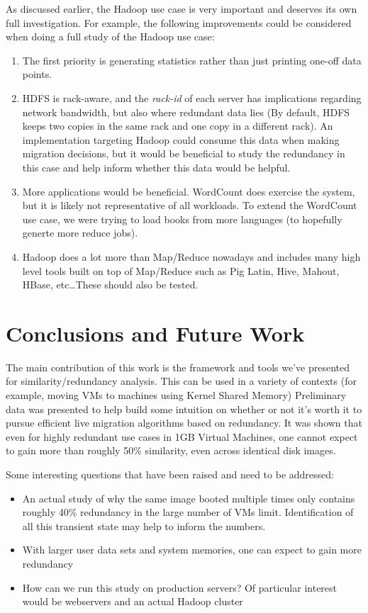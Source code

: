 \documentclass{acm_proc_article-sp}
\begin{document}
As discussed earlier, the Hadoop use case is very important and deserves its own full investigation.  For example, the following improvements could be considered when doing a full study of the Hadoop use case:
\begin{enumerate}
  \item The first priority is generating statistics rather than just printing one-off data points.
  \item HDFS is rack-aware, and the \textit{rack-id} of each server has implications regarding network bandwidth, but also where redundant data lies (By default, HDFS keeps two copies in the same rack and one copy in a different rack).  An implementation targeting Hadoop could consume this data when making migration decisions, but it would be beneficial to study the redundancy in this case and help inform whether this data would be helpful.
  \item More applications would be beneficial. WordCount does exercise the system, but it is likely not representative of all workloads.  To extend the WordCount use case, we were trying to load books from more languages (to hopefully generte more reduce jobs).
  \item Hadoop does a lot more than Map/Reduce nowadays and includes many high level tools built on top of Map/Reduce such as Pig Latin, Hive, Mahout, HBase, etc\ldots These should also be tested.
\end{enumerate}

\section{Conclusions and Future Work}
The main contribution of this work is the framework and tools we've presented for similarity/redundancy analysis.  This can be used in a variety of contexts (for example, moving VMs to machines using Kernel Shared Memory) Preliminary data was presented to help build some intuition on whether or not it's worth it to pursue efficient live migration algorithms based on redundancy.  It was shown that even for highly redundant use cases in 1GB Virtual Machines, one cannot expect to gain more than roughly 50\% similarity, even across identical disk images.

Some interesting questions that have been raised and need to be addressed:
\begin{itemize}
  \item An actual study of why the same image booted multiple times only contains roughly 40\% redundancy in the large number of VMs limit.  Identification of all this transient state may help to inform the numbers.   
  \item With larger user data sets and system memories, one can expect to gain more redundancy
  \item How can we run this study on production servers? Of particular interest would be webservers and an actual Hadoop cluster
\end{itemize}
\end{document}
